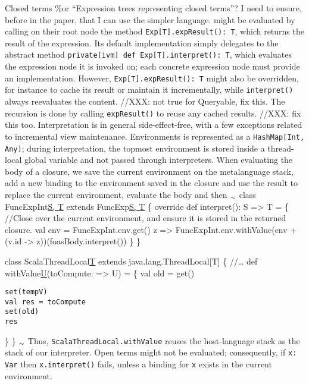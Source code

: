 \documentclass{article}
\newcommand{\textsubscr}[1]{\ensuremath{_{\scriptsize\textrm{#1}}}}
\begin{document}
Closed terms \%or ``Expression trees representing closed terms''? I need
to ensure, before in the paper, that I can use the simpler language.
might be evaluated by calling on their root node the method
\texttt{Exp{[}T{]}.expResult(): T}, which returns the result of the
expression. Its default implementation simply delegates to the abstract
method \texttt{private{[}ivm{]} def Exp{[}T{]}.interpret(): T}, which
evaluates the expression node it is invoked on; each concrete expression
node must provide an implementation. However,
\texttt{Exp{[}T{]}.expResult(): T} might also be overridden, for
instance to cache its result or maintain it incrementally, while
\texttt{interpret()} always reevaluates the content. //XXX: not true for
Queryable, fix this. The recursion is done by calling
\texttt{expResult()} to reuse any cached results. //XXX: fix this too.
Interpretation is in general side-effect-free, with a few exceptions
related to incremental view maintenance. Environments is represented as
a \texttt{HashMap{[}Int, Any{]}}; during interpretation, the topmost
environment is stored inside a thread-local global variable and not
passed through interpreters. When evaluating the body of a closure, we
save the current environment on the metalanguage stack, add a new
binding to the environment saved in the closure and use the result to
replace the current environment, evaluate the body and then
\textsubscr{\ensuremath{\sim}} class
FuncExpInt\href{val\%20foasBody:\%20Exp{[}T{]},\%20v:\%20TypedVar{[}S{]}}{S,
T} extends FuncExp\href{\%E2\%80\%A6}{S, T} \{ override def interpret():
S =\textgreater{} T = \{ //Close over the current environment, and
ensure it is stored in the returned closure. val env =
FuncExpInt.env.get() z =\textgreater{} FuncExpInt.env.withValue(env +
(v.id -\textgreater{} z))(foasBody.interpret()) \} \}

class ScalaThreadLocal\href{v:\%20=\%3E\%20T}{T} extends
java.lang.ThreadLocal{[}T{]} \{ //\ldots{} def
withValue\href{tempV:\%20T}{U}(toCompute: =\textgreater{} U) = \{ val
old = get()

\begin{verbatim}
set(tempV)
val res = toCompute
set(old)
res
\end{verbatim}
\} \} \textsubscr{\ensuremath{\sim}} Thus,
\texttt{ScalaThreadLocal.withValue} reuses the host-language stack as
the stack of our interpreter. Open terms might not be evaluated;
consequently, if \texttt{x: Var} then \texttt{x.interpret()} fails,
unless a binding for \texttt{x} exists in the current environment.
\end{document}
